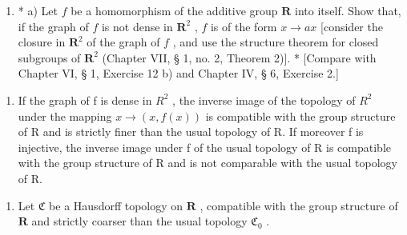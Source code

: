 \ExerciseGroupsStart
\ExerciseSection

\begin{enumerate}
\def\labelenumi{\arabic{enumi})}
\tightlist
\item
  * a) Let \(f\) be a homomorphism of the additive group \(\mathbf{R}\) into itself. Show that, if the graph of \(f\) is not dense in \(\mathbf{R}^2\) , \(f\) is of the form \(x \to ax\) {[}consider the closure in \(\mathbf{R}^2\) of the graph of \(f\) , and use the structure theorem for closed subgroups of \(\mathbf{R}^2\) (Chapter VII, § 1, no. 2, Theorem 2){]}. * {[}Compare with Chapter VI, § 1, Exercise 12 b) and Chapter IV, § 6, Exercise 2.{]}
\end{enumerate}

\begin{enumerate}
\def\labelenumi{\alph{enumi})}
\setcounter{enumi}{1}
\tightlist
\item
  If the graph of f is dense in \(R^{2}\) , the inverse image of the topology of \(R^{2}\) under the mapping \(x \to (x, f(x))\) is compatible with the group structure of R and is strictly finer than the usual topology of R. If moreover f is injective, the inverse image under f of the usual topology of R is compatible with the group structure of R and is not comparable with the usual topology of R.
\end{enumerate}

\begin{enumerate}
\def\labelenumi{\arabic{enumi})}
\setcounter{enumi}{1}
\tightlist
\item
  Let \(\mathfrak{C}\) be a Hausdorff topology on \(\mathbf{R}\) , compatible with the group structure of \(\mathbf{R}\) and strictly coarser than the usual topology \(\mathfrak{C}_0\) .
\end{enumerate}


